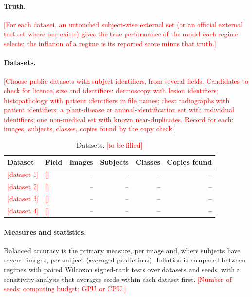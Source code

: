 \documentclass[11pt,a4paper]{article}
\newcommand{\TBD}[1]{\textcolor{red}{[#1]}}
\begin{document}
\paragraph{Truth.} \TBD{For each dataset, an untouched subject-wise external set (or an official external test set where one exists) gives the true performance of the model each regime selects; the inflation of a regime is its reported score minus that truth.}

\paragraph{Datasets.} \TBD{Choose public datasets with subject identifiers, from several fields. Candidates to check for licence, size and identifiers: dermoscopy with lesion identifiers; histopathology with patient identifiers in file names; chest radiographs with patient identifiers; a plant-disease or animal-identification set with individual identifiers; one non-medical set with known near-duplicates. Record for each: images, subjects, classes, copies found by the copy check.}

\begin{table}[t]
\centering\small
\caption{Datasets. \TBD{to be filled}}
\label{tab:datasets}
\begin{tabular}{@{}llrrrr@{}}
\toprule
Dataset & Field & Images & Subjects & Classes & Copies found \\
\midrule
\TBD{dataset 1} & \TBD{} & -- & -- & -- & -- \\
\TBD{dataset 2} & \TBD{} & -- & -- & -- & -- \\
\TBD{dataset 3} & \TBD{} & -- & -- & -- & -- \\
\TBD{dataset 4} & \TBD{} & -- & -- & -- & -- \\
\bottomrule
\end{tabular}
\end{table}

\paragraph{Measures and statistics.} Balanced accuracy is the primary measure, per image and, where subjects have several images, per subject (averaged predictions). Inflation is compared between regimes with paired Wilcoxon signed-rank tests over datasets and seeds, with a sensitivity analysis that averages seeds within each dataset first. \TBD{Number of seeds; computing budget; GPU or CPU.}

\end{document}
